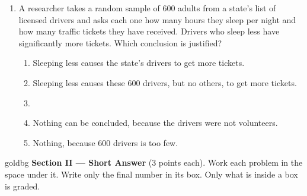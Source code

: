 \documentclass[12pt]{article}
\begin{document}
\begin{enumerate}[leftmargin=1.9em, itemsep=0.13in]
  \boxguard[13]
  \item A researcher takes a random sample of 600 adults from a state's list of licensed
        drivers and asks each one how many hours they sleep per night and how many traffic
        tickets they have received. Drivers who sleep less have significantly more tickets.
        Which conclusion is justified?
        \begin{enumerate}[label=\textbf{(\Alph*)}, leftmargin=2.2em, itemsep=2pt]
          \item Sleeping less causes the state's drivers to get more tickets.
          \item Sleeping less causes these 600 drivers, but no others, to get more tickets.
          \item {}\\
          \item Nothing can be concluded, because the drivers were not volunteers.
          \item Nothing, because 600 drivers is too few.\hfill{}\rule[-0.2in]{0pt}{0.48in}
        \end{enumerate}

\end{enumerate}

\vspace{0.14in}

\boxguard[22]
\begin{headlinebox}{goldbg}
\small
\textbf{Section II --- Short Answer} (3 points each). Work each problem in the space under it.
Write only the final number in its box. Only what is inside a box is graded.
\end{headlinebox}

\vspace{0.10in}
\end{document}
